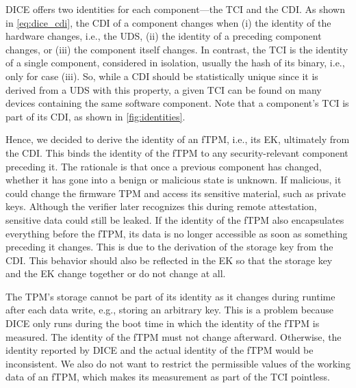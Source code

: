 DICE offers two identities for each component---the TCI and the CDI\@.
As shown in \autoref{eq:dice_cdi}, the CDI of a component changes when (i) the identity of the hardware changes, i.e., the \ac{UDS}, (ii) the identity of a preceding component changes, or (iii) the component itself changes.
In contrast, the TCI is the identity of a single component, considered in isolation, usually the hash of its binary, i.e., only for case (iii).
So, while a CDI should be statistically unique since it is derived from a \ac{UDS} with this property, a given TCI can be found on many devices containing the same software component.
Note that a component's TCI is part of its CDI, as shown in \autoref{fig:identities}.



Hence, we decided to derive the identity of an fTPM, i.e., its \ac{EK}, ultimately from the CDI\@.
This binds the identity of the fTPM to any security-relevant component preceding it.
The rationale is that once a previous component has changed, whether it has gone into a benign or malicious state is unknown.
If malicious, it could change the firmware TPM and access its sensitive material, such as private keys.
Although the verifier later recognizes this during remote attestation, sensitive data could still be leaked.
If the identity of the \ac{fTPM} also encapsulates everything before the fTPM, its data is no longer accessible as soon as something preceding it changes.
This is due to the derivation of the storage key from the CDI\@.
This behavior should also be reflected in the EK so that the storage key and the EK change together or do not change at all.

The TPM's storage cannot be part of its identity as it changes during runtime after each data write, e.g., storing an arbitrary key.
This is a problem because DICE only runs during the boot time in which the identity of the fTPM is measured.
The identity of the fTPM must not change afterward.
Otherwise, the identity reported by DICE and the actual identity of the fTPM would be inconsistent.
We also do not want to restrict the permissible values of the working data of an fTPM, which makes its measurement as part of the TCI pointless.

